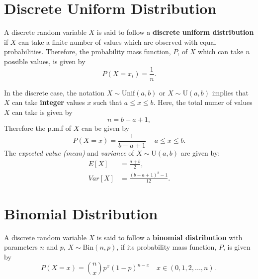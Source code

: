 \section{Discrete Uniform Distribution} \label{mo2:section:DiscreteUniform}

\begin{defn} \label{mod2:defn:DiscreteUniform}
	A discrete random variable $X$ is said to follow a \textbf{discrete uniform distribution} if $X$ can take a finite number of values which are observed with equal probabilities. Therefore, the probability mass function, $P$, of $X$ which can take $n$ possible values,  is given by
	\begin{equation}
		P(X = x_i) = \frac{1}{n} \label{mod2:eq:DiscreteUniform}.
	\end{equation}
\end{defn}

\begin{note}\label{mod2:note:DiscreteUniform}
	In the discrete case, the notation $X \sim \text{Unif}(a, b)$ or $X \sim \text{U}(a, b)$ implies that $X$ can take \textbf{integer} values $x$ such that $a \leq x \leq b$. Here, the total numer of values $X$ can take is given by
	\begin{equation}
		n = b - a + 1,
	\end{equation}
	Therefore the p.m.f of $X$ can be given by
	\begin{equation}
	P(X = x)= \frac{1}{b - a + 1}\ \quad a \leq x \leq b.
	\end{equation}
		The \textit{expected value (mean)} and \textit{variance} of $X \sim \text{U}(a,b)$ are given by:
	\begin{align}
	E[X] &= \frac{a+b}{2}, \label{mod2:eq:DiscreteUniform:Mean} \\
	Var[X] &= \frac{(b-a+1)^2 - 1}{12}. \label{mod2:eq:DiscreteUniform:Variance} 
	\end{align}
\end{note}




\section{Binomial Distribution} \label{mod2:section:Binomial}
\begin{defn} \label{mod2:defn:Binomial}
	A discrete random variable $X$ is said to follow a \textbf{binomial distribution} with parameters $n$ and $p$, $X \sim \text{Bin}(n,p)$, if its probability mass function, $P$, is given by
	\begin{equation}
	P(X = x) = { n \choose x} p^x (1-p)^{n-x} \quad x \in ( 0, 1, 2, ... , n). \label{mod2:eq:BinomialDist} \ 
	\end{equation} 
\end{defn}

